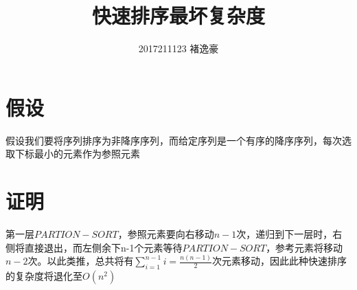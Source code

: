 \documentclass[UTF8]{ctexart}
\author{2017211123 褚逸豪}
\title{快速排序最坏复杂度}
\begin{document}
    \maketitle
    \section{假设}
    假设我们要将序列排序为非降序序列，而给定序列是一个有序的降序序列，每次选取下标最小的元素作为参照元素
    \section{证明}
    第一层$PARTION-SORT$，参照元素要向右移动$n-1$次，递归到下一层时，右侧将直接退出，而左侧余下n-1个元素等待$PARTION-SORT$，参考元素将移动$n-2$次。以此类推，总共将有$\sum_{i=1}^{n-1}i=\frac{n(n-1)}{2}$次元素移动，因此此种快速排序的复杂度将退化至$O(n^2)$
    
\end{document}
